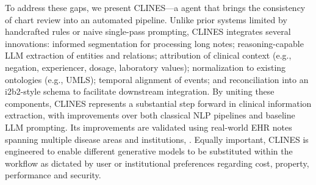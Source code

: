 To address these gaps, we present CLINES—a  agent that brings the consistency of chart review into an automated pipeline. Unlike prior systems limited by handcrafted rules or naive single-pass prompting, CLINES integrates several innovations: informed segmentation for processing long notes; reasoning-capable LLM extraction of entities and relations; attribution of clinical context (e.g., negation, experiencer, dosage, laboratory values); normalization to existing ontologies (e.g., UMLS); temporal alignment of events; and reconciliation into an i2b2-style schema to facilitate downstream integration. By uniting these components, CLINES represents a substantial step forward in clinical information extraction, with improvements over both classical NLP pipelines and baseline LLM prompting. Its improvements are validated using real-world EHR notes spanning multiple disease areas and institutions, . Equally important, CLINES is engineered to enable different generative models to be substituted within the workflow as dictated by user or institutional preferences regarding cost, property, performance and security. 
